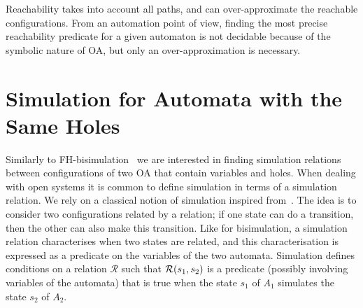 \documentclass[runningheads]{llncs}
\begin{document}
Reachability takes into account all paths, and can over-approximate the reachable configurations. 
From an automation point of view, finding the most precise reachability predicate for a given automaton is not decidable because of the symbolic nature of OA, but only an over-approximation is necessary.


\section{Simulation  for Automata with the Same Holes}\label{sec:refinement}

Similarly to FH-bisimulation~\cite{AMHEEMA:2023} we are interested  in finding simulation relations between configurations of two OA that contain variables and holes. When dealing with open systems it is common to define simulation in terms of a simulation relation.
We rely on a classical notion of simulation inspired from~\cite{AMHEEMA:2023}. The idea is to consider two configurations related by a relation; if one state can do a transition, then the other can also make this transition. 
Like for bisimulation, a simulation relation characterises when two states are related, and this  characterisation is expressed as a predicate on the variables of the two automata.
Simulation defines conditions on a relation $\mathcal{R}$ such that $\mathcal{R}{\left(s_1, s_2\right)}$ is a predicate (possibly involving variables of the automata) that is true when the state $s_1$ of $A_1$ simulates the state $s_2$ of $A_2$.



%
\end{document}
